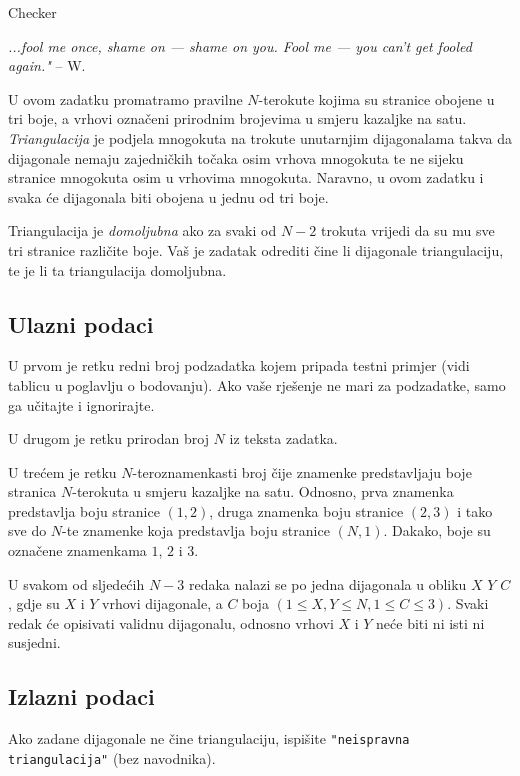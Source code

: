 \begin{statement}[
  problempoints=110,
  timelimit=1 sekund1,
  memorylimit=512 MiB,
]{Checker}

\textit{...fool me once, shame on — shame on you. Fool me — you can't get fooled again."}
-- W.

U ovom zadatku promatramo pravilne $N$-terokute kojima su stranice obojene u
tri boje, a vrhovi označeni prirodnim brojevima u smjeru kazaljke na satu.
\textit{Triangulacija} je podjela mnogokuta na trokute unutarnjim
dijagonalama takva da dijagonale nemaju zajedničkih točaka osim vrhova
mnogokuta te ne sijeku stranice mnogokuta osim u vrhovima mnogokuta.
Naravno, u ovom zadatku i svaka će dijagonala biti obojena u jednu od tri
boje.

Triangulacija je \textit{domoljubna} ako za svaki od $N-2$ trokuta vrijedi da
su mu sve tri stranice različite boje. Vaš je zadatak odrediti čine li
dijagonale triangulaciju, te je li ta triangulacija domoljubna.

\subsection*{Ulazni podaci}
U prvom je retku redni broj podzadatka kojem pripada testni primjer
(vidi tablicu u poglavlju o bodovanju). Ako vaše rješenje ne mari za podzadatke,
samo ga učitajte i ignorirajte.

U drugom je retku prirodan broj $N$ iz teksta zadatka.

U trećem je retku $N$-teroznamenkasti broj čije znamenke predstavljaju boje
stranica $N$-terokuta u smjeru kazaljke na satu. Odnosno, prva znamenka
predstavlja boju stranice $(1,2)$, druga znamenka boju stranice $(2,3)$ i tako
sve do $N$-te znamenke koja predstavlja boju stranice $(N, 1)$. Dakako, boje su
označene znamenkama $1$, $2$ i $3$.

U svakom od sljedećih $N-3$ redaka nalazi se po jedna dijagonala u obliku
$X$ $Y$ $C$, gdje su $X$ i $Y$ vrhovi dijagonale, a $C$ boja
$(1 \le X, Y \le N, 1 \le C \le 3)$. Svaki redak će opisivati validnu
dijagonalu, odnosno vrhovi $X$ i $Y$ neće biti ni isti ni susjedni.

\subsection*{Izlazni podaci}
Ako zadane dijagonale ne čine triangulaciju, ispišite
\texttt{"neispravna triangulacija"} (bez navodnika).


\end{statement}
